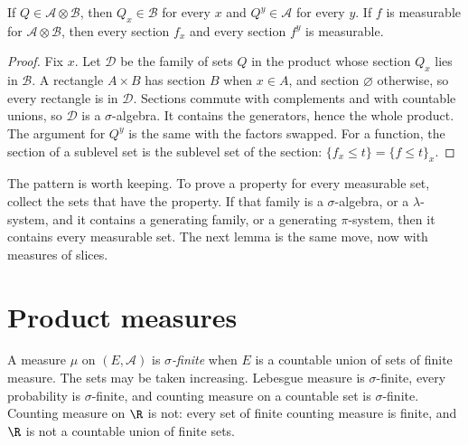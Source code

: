\begin{lemma}\label{lem:sections}
If $Q\in\mathcal A\otimes\mathcal B$, then $Q_x\in\mathcal B$ for every $x$ and $Q^y\in\mathcal A$ for every $y$. If $f$ is measurable for $\mathcal A\otimes\mathcal B$, then every section $f_x$ and every section $f^y$ is measurable.
\end{lemma}
\begin{proof}
Fix $x$. Let $\mathcal D$ be the family of sets $Q$ in the product whose section $Q_x$ lies in $\mathcal B$. A rectangle $A\times B$ has section $B$ when $x\in A$, and section $\varnothing$ otherwise, so every rectangle is in $\mathcal D$. Sections commute with complements and with countable unions, so $\mathcal D$ is a $\sigma$-algebra. It contains the generators, hence the whole product. The argument for $Q^y$ is the same with the factors swapped. For a function, the section of a sublevel set is the sublevel set of the section: $\{f_x\le t\}=\{f\le t\}_x$.
\end{proof}

The pattern is worth keeping. To prove a property for every measurable set, collect the sets that have the property. If that family is a $\sigma$-algebra, or a $\lambda$-system, and it contains a generating family, or a generating $\pi$-system, then it contains every measurable set. The next lemma is the same move, now with measures of slices.

\section{Product measures}

A measure $\mu$ on $(E,\mathcal A)$ is \emph{$\sigma$-finite} when $E$ is a countable union of sets of finite measure. The sets may be taken increasing. Lebesgue measure is $\sigma$-finite, every probability is $\sigma$-finite, and counting measure on a countable set is $\sigma$-finite. Counting measure on $\R$ is not: every set of finite counting measure is finite, and $\R$ is not a countable union of finite sets.

